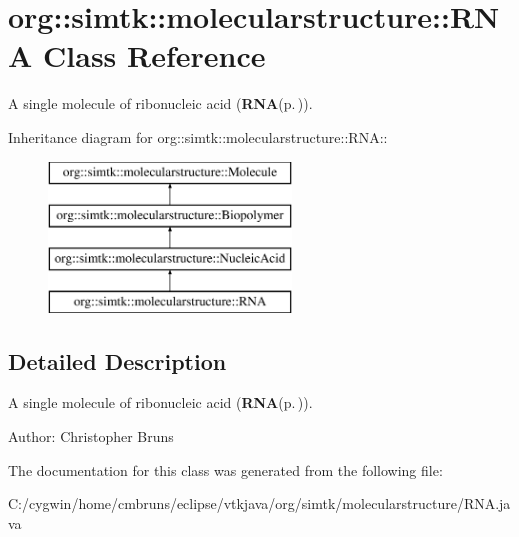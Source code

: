 \section{org::simtk::molecularstructure::RNA Class Reference}
\label{classorg_1_1simtk_1_1molecularstructure_1_1_r_n_a}
A single molecule of ribonucleic acid ({\bf RNA}{\rm (p.\,\pageref{classorg_1_1simtk_1_1molecularstructure_1_1_r_n_a})}).  


Inheritance diagram for org::simtk::molecularstructure::RNA::\begin{figure}[H]
\begin{center}
\leavevmode
\includegraphics[height=4cm]{classorg_1_1simtk_1_1molecularstructure_1_1_r_n_a}
\end{center}
\end{figure}


\subsection{Detailed Description}
A single molecule of ribonucleic acid ({\bf RNA}{\rm (p.\,\pageref{classorg_1_1simtk_1_1molecularstructure_1_1_r_n_a})}). 

\begin{Desc}
\item[Author:]Christopher Bruns \end{Desc}




The documentation for this class was generated from the following file:\begin{CompactItemize}
\item 
C:/cygwin/home/cmbruns/eclipse/vtkjava/org/simtk/molecularstructure/RNA.java\end{CompactItemize}
